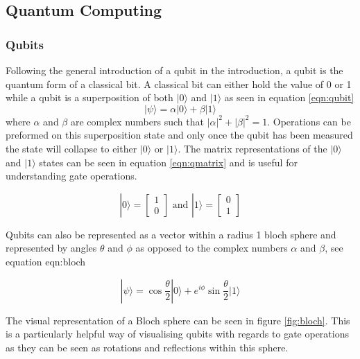 \subsection{Quantum Computing}
\subsubsection{Qubits}
Following the general introduction of a qubit in the introduction, a qubit is the quantum form of a classical bit. 
A classical bit can either hold the value of 0 or 1 while a qubit is a superposition of both $|0\rangle$ and $|1\rangle$ as seen in equation \ref{eqn:qubit}
\begin{equation}\label{eqn:qubit}
    |\psi\rangle = \alpha|0\rangle + \beta|1\rangle
\end{equation}
where $\alpha$ and $\beta$ are complex numbers such that $|\alpha|^2 + |\beta|^2 = 1$.
Operations can be preformed on this superposition state and only once the qubit has been measured the state will collapse to either $|0\rangle$ or $|1\rangle$. \cite{nielsen_quantum_2010}
The matrix representations of the $|0\rangle$ and $|1\rangle$ states can be seen in equation \ref{eqn:qmatrix} and is useful for understanding gate operations.

\begin{equation}\label{eqn:qmatrix}
    |0\rangle = \begin{bmatrix}
1 \\
0 
\end{bmatrix} \text{ and } |1\rangle = \begin{bmatrix}
0 \\
1 
\end{bmatrix}  
\end{equation}

Qubits can also be represented as a vector within a radius 1 bloch sphere and represented by angles $\theta$ and $\phi$ as opposed to the complex numbers $\alpha$ and $\beta$, see equation {eqn:bloch}

\begin{equation}\label{eqn:bloch}
    |\psi \rangle = \cos \frac{\theta}{2}|0\rangle + e^{i \phi}\sin \frac{\theta}{2} |1\rangle
\end{equation}

The visual representation of a Bloch sphere can be seen in figure \ref{fig:bloch}.
This is a particularly helpful way of visualising qubits with regards to gate operations as they can be seen as rotations and reflections within this sphere. \cite{noauthor_representing_nodate}


